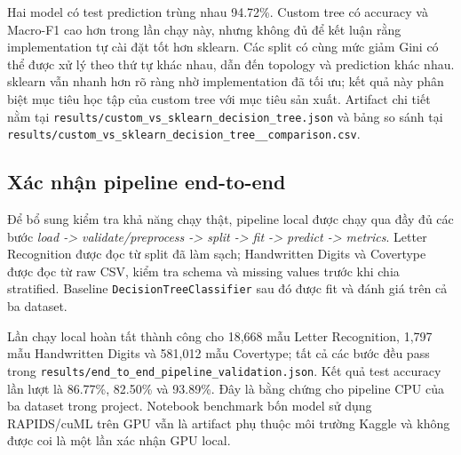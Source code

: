 Hai model có test prediction trùng nhau 94.72\%. Custom tree có accuracy và Macro-F1
cao hơn trong lần chạy này, nhưng không đủ để kết luận rằng implementation tự cài đặt
tốt hơn sklearn. Các split có cùng mức giảm Gini có thể được xử lý theo thứ tự khác nhau,
dẫn đến topology và prediction khác nhau. sklearn vẫn nhanh hơn rõ ràng nhờ implementation
đã tối ưu; kết quả này phân biệt mục tiêu học tập của custom tree với mục tiêu sản xuất.
Artifact chi tiết nằm tại \nolinkurl{results/custom_vs_sklearn_decision_tree.json} và bảng
so sánh tại \nolinkurl{results/custom_vs_sklearn_decision_tree__comparison.csv}.

\subsection{Xác nhận pipeline end-to-end}

Để bổ sung kiểm tra khả năng chạy thật, pipeline local được chạy qua đầy đủ các bước
\textit{load -> validate/preprocess -> split -> fit -> predict -> metrics}. Letter
Recognition được đọc từ split đã làm sạch; Handwritten Digits và Covertype được đọc từ
raw CSV, kiểm tra schema và missing values trước khi chia stratified. Baseline
\texttt{DecisionTreeClassifier} sau đó được fit và đánh giá trên cả ba dataset.

Lần chạy local hoàn tất thành công cho 18,668 mẫu Letter Recognition, 1,797 mẫu
Handwritten Digits và 581,012 mẫu Covertype; tất cả các bước đều pass trong
\nolinkurl{results/end_to_end_pipeline_validation.json}. Kết quả test accuracy lần lượt là
86.77\%, 82.50\% và 93.89\%. Đây là bằng chứng cho pipeline CPU của ba dataset trong
project. Notebook benchmark bốn model sử dụng RAPIDS/cuML trên GPU vẫn là artifact phụ
thuộc môi trường Kaggle và không được coi là một lần xác nhận GPU local.
